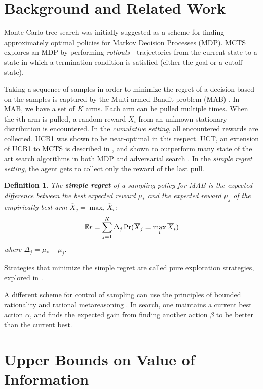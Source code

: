 \documentclass{ecai2012}
\newcommand {\IE} {\ensuremath {\mathbb{E}}}
\newtheorem{dfn}{Definition}
\begin{document}
\section{Background and Related Work}
\label{sec:related-work}

Monte-Carlo tree search was initially suggested as a scheme for
finding approximately optimal policies for Markov Decision Processes
(MDP).  MCTS explores an MDP by performing
\emph{rollouts}---trajectories from the current state to a state in
which a termination condition is satisfied (either the goal or a
cutoff state).

Taking a sequence of samples in order to minimize the regret of a
decision based on the samples is captured by the Multi-armed Bandit
problem (MAB) \cite{Vermorel.bandits}. In MAB, we have a set of $K$
arms. Each arm can be pulled multiple times. When the $i$th arm is
pulled, a random reward $X_i$ from an unknown stationary distribution
is encountered. In the \textit{cumulative setting}, all encountered rewards are
collected.  UCB1 \cite{Auer.ucb} was shown to be
near-optimal in this respect. UCT, an extension of UCB1 to MCTS is
described in \cite{Kocsis.uct}, and shown to outperform many state of
the art search algorithms in both MDP and adversarial search
\cite{Gelly.mogo,Eyerich.ctp}. In the \textit{simple regret setting}, the agent
gets to collect only the reward of the last pull.
\begin{dfn}
The \textbf{simple regret} of a sampling policy for MAB
is the expected difference between the best expected reward
$\mu_*$ and the expected reward $\mu_j$ of the empirically best arm
$\overline X_j=\max_i\overline X_i$:
\begin{equation}
\IE r=\sum_{j=1}^K\Delta_j\Pr(\overline X_j=\max_i\overline X_i)
\label{eqn:simple-regret}
\vspace{-8pt}
\end{equation}
where $\Delta_j=\mu_*-\mu_j$.
\end{dfn}
Strategies that minimize the simple regret are called pure exploration
strategies, explored in \cite{Bubeck.pure}. 

A different scheme for control of sampling can use the principles of
bounded rationality \cite{Horvitz.reasoningabout} and rational
metareasoning \cite{Russell.right}.  In search, one maintains a
current best action $\alpha$, and finds the expected gain
from finding another action $\beta $ to be better than the current best.

\section{Upper Bounds on Value of Information}
\end{document}
